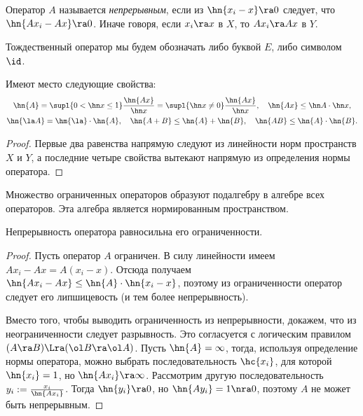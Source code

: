 \documentclass[a4paper]{article}
\begin{document}
\begin{df}
Оператор $A$ называется \emph{непрерывным}, если из $\hn{x_i - x} \ra 0$ следует,
что $\hn{Ax_i - Ax} \ra 0$. Иначе говоря, если $x_i \ra x$ в $X$, то $Ax_i \ra Ax$ в $Y$.
\end{df}

Тождественный оператор мы будем обозначать либо буквой $E$, либо символом $\id$.

\begin{lemma}
Имеют место следующие свойства:
\begin{gather*}
  \hn{A} = \supl{0 < \hn x \le 1} \frac{\hn{A x}}{\hn x} =
  \supl{\hn x \neq 0}\frac{\hn{A x}}{\hn x}, \quad
  \hn{A x} \le \hn A \cdot \hn x,\\
  \hn{\la A} = \hm{\la}\cdot\hn{A},\quad
  \hn{A+B} \le \hn{A} + \hn{B}, \quad
  \hn{A B} \le \hn{A} \cdot \hn{B}.
\end{gather*}
\end{lemma}
\begin{proof}
Первые два равенства напрямую следуют из линейности норм пространств $X$ и $Y$,
а последние четыре свойства вытекают напрямую из определения нормы оператора.
\end{proof}

\begin{imp}
Множество ограниченных операторов образуют подалгебру в алгебре всех операторов.
Эта алгебра является нормированным пространством.
\end{imp}

\begin{theorem}
Непрерывность оператора равносильна его ограниченности.
\end{theorem}
\begin{proof}
Пусть оператор $A$ ограничен. В силу линейности имеем
$Ax_i - Ax = A(x_i -x)$. Отсюда получаем $\hn{Ax_i - Ax} \le \hn{A} \cdot \hn{x_i - x}$,
поэтому из ограниченности оператор следует его липшицевость (и тем более непрерывность).

Вместо того, чтобы выводить ограниченность из непрерывности, докажем, что из неограниченности
следует разрывность. Это согласуется с логическим правилом $(A \ra B) \Lra (\ol B \ra \ol A)$.
Пусть $\hn{A} = \infty$, тогда, используя определение нормы оператора, можно выбрать
последовательность $\hc{x_i}$, для которой $\hn{x_i} = 1$, но $\hn{Ax_i} \ra \infty$. Рассмотрим
другую последовательность $y_i := \frac{x_i}{\hn{Ax_i}}$. Тогда $\hn{y_i} \ra 0$, но $\hn{Ay_i} = 1
\nra 0$, поэтому $A$ не может быть непрерывным.
\end{proof}
\end{document}
